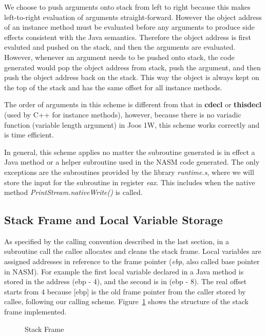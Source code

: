 \documentclass[a4paper, notitlepage]{report}
\begin{document}
We choose to push arguments onto stack from left to right because this makes left-to-right evaluation of arguments straight-forward. However the object address of an instance method must be evaluated before any arguments to produce side effects consistent with the Java semantics. Therefore the object address is first evaluted and pushed on the stack, and then the arguments are evaluated. However, whenever an argument needs to be pushed onto stack, the code generated would pop the object address from stack, push the argument, and then push the object address back on the stack. This way the object is always kept on the top of the stack and has the same offset for all instance methods.

The order of arguments in this scheme is different from that in \textbf{cdecl} or \textbf{thisdecl} (used by C++ for instance methods), however, because there is no variadic function (variable length argument) in Joos 1W, this scheme works correctly and is time efficient.

In general, this scheme applies no matter the subroutine generated is in effect a Java method or a helper subroutine used in the NASM code generated. The only exceptions are the subroutines provided by the library \emph{runtime.s}, where we will store the input for the subroutine in register \emph{eax}. This includes when the native method \emph{PrintStream.nativeWrite()} is called.


\subsection{Stack Frame and Local Variable Storage}


As specified by the calling convention described in the last section, in a subroutine call the callee allocates and cleans the stack frame. Local variables are assigned addresses in reference to the frame pointer (\emph{ebp}, also called base pointer in NASM). For example the first local variable declared in a Java method is stored in the address (ebp - 4), and the second is in (ebp - 8). The real offset starts from 4 because [ebp] is the old frame pointer from the caller stored by callee, following our calling scheme. Figure~\ref{stack_frame} shows the structure of the stack frame implemented.

\begin{figure}
  \caption{Stack Frame}
  \label{stack_frame}
\end{figure}

\end{document}
